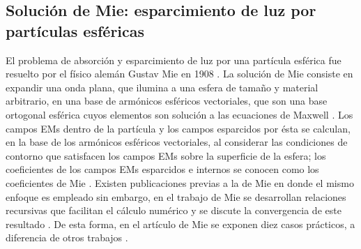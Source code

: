 \documentclass[letterpaper,11pt] {article}
\begin{document}
	\subsection{Solución de Mie: esparcimiento de luz por partículas esféricas}
	
El problema de absorción y esparcimiento de luz por una partícula esférica fue resuelto por el físico alemán Gustav Mie en 1908 \cite{mie1908metallosung}.  La solución de Mie consiste en expandir una onda plana, que ilumina a una esfera de tamaño y material arbitrario, en una base de armónicos esféricos vectoriales, que son una base ortogonal esférica cuyos elementos son solución a las ecuaciones de Maxwell \cite{bohren1998absorption}.  Los campos EMs dentro de la partícula y los campos esparcidos por ésta se calculan, en la base de los armónicos esféricos vectoriales, al considerar las condiciones de contorno que satisfacen los campos EMs sobre la superficie de la esfera; los coeficientes de los campos EMs esparcidos e internos se conocen como los coeficientes de Mie \cite{bohren1998absorption}.  Existen publicaciones previas a la de Mie en donde el mismo enfoque es empleado \cite{horvath2009historic} sin embargo, en el trabajo de Mie se  desarrollan relaciones recursivas que facilitan el cálculo numérico y se discute la convergencia de este resultado \cite{horvath2009historic}.  De esta forma, en el artículo de Mie se exponen diez casos prácticos, a diferencia de otros trabajos \cite{horvath2009historic}. 
\end{document}
